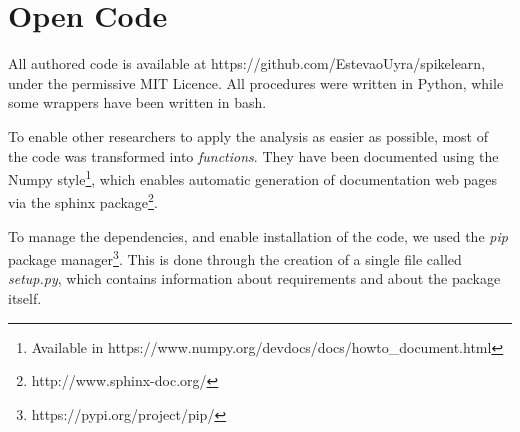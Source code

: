 \chapter{Open Code}
    All authored code is available at https://github.com/EstevaoUyra/spikelearn, under the permissive MIT Licence. All procedures were written in Python, while some wrappers have been written in bash.

    To enable other researchers to apply the analysis as easier as possible, most of the code was transformed into \textit{functions}. They have been documented using the Numpy style\footnote{Available in https://www.numpy.org/devdocs/docs/howto\_document.html}, which enables automatic generation of documentation web pages via the sphinx package\footnote{http://www.sphinx-doc.org/}. 

    To manage the dependencies, and enable installation of the code, we used the \textit{pip} package manager\footnote{https://pypi.org/project/pip/}. This is done through the creation of a single file called \textit{setup.py}, which contains information about requirements and about the package itself.
